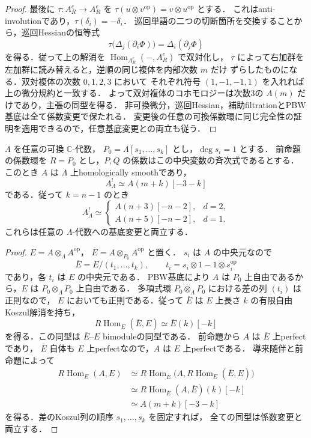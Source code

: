 \begin{proof}
最後に $\tau:A^e_R\to A^e_R$ を
$\tau(u\otimes v^{\mathrm{op}})=v\otimes u^{\mathrm{op}}$ とする．
これはanti-involutionであり，$\tau(\delta_i)=-\delta_i$．
巡回単語の二つの切断箇所を交換することから，巡回Hessianの恒等式
\[
 \tau\bigl(\Delta_j(\partial_i\Phi)\bigr)
       =\Delta_i(\partial_j\Phi)
\]
を得る．従って上の解消を $\operatorname{Hom}_{A^e_R}(-,A^e_R)$ で双対化し，
$\tau$ によって右加群を左加群に読み替えると，逆順の同じ複体を内部次数 $m$ だけ
ずらしたものになる．双対複体の次数 $0,1,2,3$ において
それぞれ符号 $(1,-1,-1,1)$ を入れれば上の微分規約と一致する．
よって双対複体のコホモロジーは次数3の $A(m)$ だけであり，主張の同型を得る．
非可換微分，巡回Hessian，補助filtrationとPBW基底は全て係数変更で保たれる．
変更後の任意の可換係数環に同じ完全性の証明を適用できるので，任意基底変更との両立も従う．
\end{proof}

\begin{proposition}\label{prop:finite-separated-absolute-cy}
$\Lambda$ を任意の可換 $\mathbb C$-代数，
$P_0=\Lambda[s_1,\ldots,s_k]$ とし，$\deg s_i=1$ とする．
前命題の係数環を $R=P_0$ とし，$P,Q$ の係数はこの中央変数の斉次式であるとする．
このとき $A$ は $\Lambda$ 上homologically smoothであり，
\[
 A^!_\Lambda\simeq A(m+k)[-3-k]
\]
である．従って $k=n-1$ のとき
\[
 A^!_\Lambda\simeq
 \begin{cases}
   A(n+3)[-n-2],&d=2,\\
   A(n+5)[-n-2],&d=1.
 \end{cases}
\]
これらは任意の $\Lambda$-代数への基底変更と両立する．
\end{proposition}
\begin{proof}
$E=A\otimes_\Lambda A^{\mathrm{op}}$，
$\overline E=A\otimes_{P_0}A^{\mathrm{op}}$ と置く．
$s_i$ は $A$ の中央元なので
\[
 \overline E=E/(t_1,\ldots,t_k),\qquad
 t_i=s_i\otimes1-1\otimes s_i^{\mathrm{op}}
\]
であり，各 $t_i$ は $E$ の中央元である．
PBW基底により $A$ は $P_0$ 上自由であるから，$E$ は
$P_0\otimes_\Lambda P_0$ 上自由である．
多項式環 $P_0\otimes_\Lambda P_0$ における差の列 $(t_i)$ は正則なので，
$E$ においても正則である．従って $\overline E$ は $E$ 上長さ $k$ の有限自由
Koszul解消を持ち，
\[
 R\!\operatorname{Hom}_{E}(\overline E,E)
      \simeq\overline E(k)[-k]
\]
を得る．この同型は $\overline E$--$E$ bimoduleの同型である．
前命題から $A$ は $\overline E$ 上perfectであり，
$\overline E$ 自体も $E$ 上perfectなので，$A$ は $E$ 上perfectである．
導来随伴と前命題によって
\begin{align*}
 R\!\operatorname{Hom}_E(A,E)
 &\simeq R\!\operatorname{Hom}_{\overline E}
       \bigl(A,R\!\operatorname{Hom}_E(\overline E,E)\bigr)\\
 &\simeq R\!\operatorname{Hom}_{\overline E}(A,\overline E)(k)[-k]\\
 &\simeq A(m+k)[-3-k]
\end{align*}
を得る．差のKoszul列の順序 $s_1,\ldots,s_k$ を固定すれば，
全ての同型は係数変更と両立する．
\end{proof}

